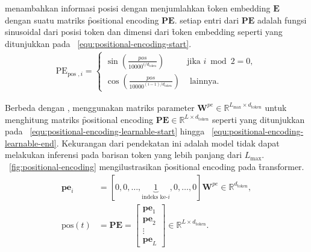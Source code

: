 	\cite{transformerori} menambahkan informasi posisi dengan menjumlahkan \f{token embedding} $\mathbf{E}$ dengan suatu matriks \f{positional encoding} $\mathbf{PE}$. setiap entri dari $\mathbf{PE}$ adalah fungsi sinusoidal dari posisi token  dan dimensi dari \f{token embedding} seperti yang ditunjukkan pada \equ~\ref{equ:positional-encoding-start}.
	\begin{align}
		\label{equ:positional-encoding-start}
		\text{PE}_{ \text {pos }, i}= \begin{cases}\sin \left(\frac{p o s}{10000^{i / d_{\text {token}}}}\right) & \text {jika } i \bmod 2=0 ,\\ \cos \left(\frac{p o s}{10000^{(i-1) / d_{\text {token}}}}\right) & \text { lainnya. }\end{cases}
	\end{align}

	Berbeda dengan \cite{transformerori}, \cite{bertori} menggunakan matriks parameter $\mathbf{W}^{pe} \in \mathbb{R}^{L_{\max} \times d_{\text{token}}}$ untuk menghitung matriks \f{positional encoding} $\mathbf{PE} \in \mathbb{R}^{L \times d_{\text{token}}}$ seperti yang ditunjukkan pada \equ~\ref{equ:positional-encoding-learnable-start} hingga \equ~\ref{equ:positional-encoding-learnable-end}. Kekurangan dari pendekatan ini adalah model tidak dapat melakukan inferensi pada barisan token yang lebih panjang dari $L_{\max}$. \pic~\ref{fig:positional-encoding} mengilustrasikan \f{positional encoding} pada \f{transformer}.
	\begin{align}
		\label{equ:positional-encoding-learnable-start}
		\mathbf{pe}_{i} &= [0, 0,\dots, \underbrace{1}_{\text{indeks ke-}i},0, \dots, 0] \mathbf{W}^{pe} \in \mathbb{R}^{d_{\text{token}}}, \\
		\label{equ:positional-encoding-learnable-end}
		 \text{pos}(t) &= \mathbf{PE} = \begin{bmatrix}
			\mathbf{pe}_1 \\
			\mathbf{pe}_2 \\
			\vdots \\
			\mathbf{pe}_L
		\end{bmatrix} \in \mathbb{R}^{L \times d_{\text{token}}}.
	\end{align}



